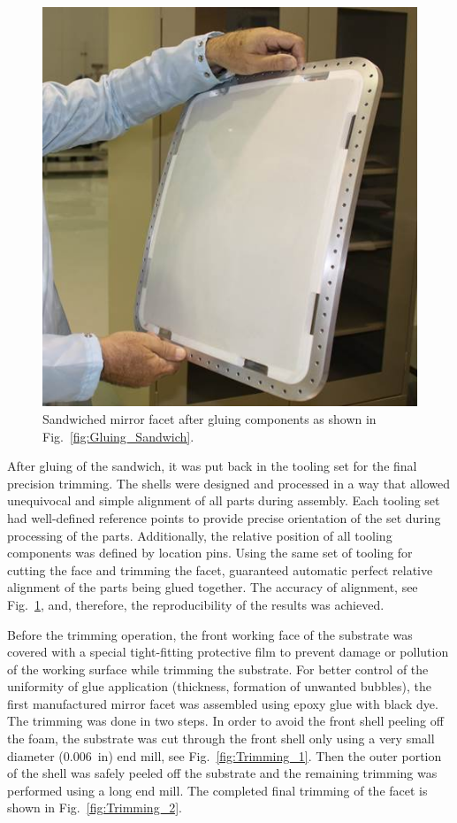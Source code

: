\begin{figure}[ht]
    \centering
    \includegraphics[width=0.9\linewidth]{images/Assembled_Sandwich.jpg}
    \caption{Sandwiched mirror facet after gluing components as shown in Fig.~\ref{fig:Gluing_Sandwich}.}
    \label{fig:Assembled_Sandwich}
\end{figure}

After gluing of the sandwich, it was put back in the tooling set for the final precision trimming. The shells were
designed and processed in a way that allowed unequivocal and simple alignment of all parts during assembly. Each
tooling set had well-defined reference points to provide precise orientation of the set during processing of the
parts. Additionally, the relative position of all tooling components was defined by location pins. Using the same
set of tooling for cutting the face and trimming the facet, guaranteed automatic perfect relative alignment of
the parts being glued together. The accuracy of alignment, see Fig.~\ref{fig:Assembled_Sandwich}, and,
therefore, the reproducibility of the results was achieved.

Before the trimming operation, the front working face of the substrate was covered with a special tight-fitting
protective film to prevent damage or pollution of the working surface while trimming the substrate. For better
control of the uniformity of glue application (thickness, formation of unwanted bubbles), the first manufactured
mirror facet was assembled using epoxy glue with black dye. The trimming was done in two steps. In order to
avoid the front shell peeling off the foam, the substrate  was cut through the front shell only using a very small
diameter (0.006~in) end mill, see Fig.~\ref{fig:Trimming_1}. Then the outer portion of the shell was safely
peeled off the substrate and the remaining trimming was performed using a long end mill. The completed final
trimming of the facet is shown in Fig.~\ref{fig:Trimming_2}.

